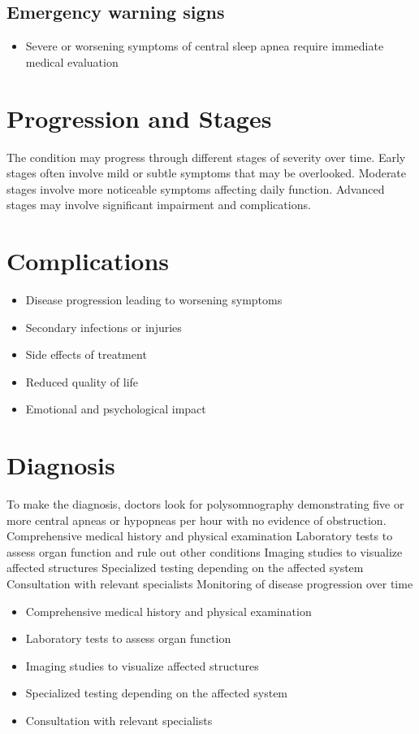 \subsection{Emergency warning signs}
\begin{itemize}[noitemsep]
  \item Severe or worsening symptoms of central sleep apnea require immediate medical evaluation
\end{itemize}
\section{Progression and Stages}
The condition may progress through different stages of severity over time. Early stages often involve mild or subtle symptoms that may be overlooked. Moderate stages involve more noticeable symptoms affecting daily function. Advanced stages may involve significant impairment and complications.
\section{Complications}
\begin{itemize}[noitemsep]
  \item Disease progression leading to worsening symptoms
  \item Secondary infections or injuries
  \item Side effects of treatment
  \item Reduced quality of life
  \item Emotional and psychological impact
\end{itemize}
\section{Diagnosis}
To make the diagnosis, doctors look for polysomnography demonstrating five or more central apneas or hypopneas per hour with no evidence of obstruction. Comprehensive medical history and physical examination Laboratory tests to assess organ function and rule out other conditions Imaging studies to visualize affected structures Specialized testing depending on the affected system Consultation with relevant specialists Monitoring of disease progression over time

\begin{itemize}[noitemsep]
  \item Comprehensive medical history and physical examination
  \item Laboratory tests to assess organ function
  \item Imaging studies to visualize affected structures
  \item Specialized testing depending on the affected system
  \item Consultation with relevant specialists
\end{itemize}
